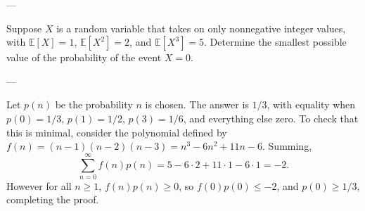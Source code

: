 
---

Suppose $X$ is a random variable that takes on only nonnegative integer values, with $\mathbb E[X]=1$, $\mathbb E[X^2]=2$, and $\mathbb E[X^3]=5$. Determine the smallest possible value of the probability of the event $X=0$.

---

Let $p(n)$ be the probability $n$ is chosen. The answer is $1/3$, with equality when $p(0)=1/3$, $p(1)=1/2$, $p(3)=1/6$, and everything else zero. To check that this is minimal, consider the polynomial defined by $f(n)=(n-1)(n-2)(n-3)=n^3-6n^2+11n-6$. Summing, \[\sum_{n=0}^\infty f(n)p(n)=5-6\cdot2+11\cdot1-6\cdot1=-2.\]
However for all $n\ge1$, $f(n)p(n)\ge0$, so $f(0)p(0)\le-2$, and $p(0)\ge1/3$, completing the proof.

